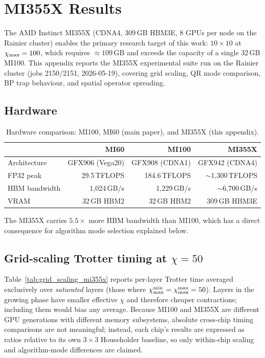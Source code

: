 \section{MI355X Results}
\label{app:mi355x}

The AMD Instinct MI355X (CDNA4, 309\,GB HBM3E, 8 GPUs per node on the Rainier
cluster) enables the primary research target of this work: $10\times10$ at
$\chi_{\mathrm{max}}=100$, which requires $\approx 109$\,GB and exceeds the capacity of a
single 32\,GB MI100.
This appendix reports the MI355X experimental suite run on the Rainier cluster
(jobs 2150/2151, 2026-05-19), covering grid scaling, QR mode comparison, BP
trap behaviour, and spatial operator spreading.

\subsection*{Hardware}

\begin{table}[ht]
\centering
\caption{Hardware comparison: MI100, MI60 (main paper), and MI355X (this appendix).}
\label{tab:hardware_mi355x}
\small
\begin{tabular}{lrrr}
\toprule
                  & MI60              & MI100             & MI355X \\
\midrule
Architecture      & GFX906 (Vega20)   & GFX908 (CDNA1)    & GFX942 (CDNA4) \\
FP32 peak         & 29.5\,TFLOPS      & 184.6\,TFLOPS     & $\sim$1{,}300\,TFLOPS \\
HBM bandwidth     & 1{,}024\,GB/s     & 1{,}229\,GB/s     & $\sim$6{,}700\,GB/s \\
VRAM              & 32\,GB HBM2       & 32\,GB HBM2       & 309\,GB HBM3E \\
\bottomrule
\end{tabular}
\end{table}

The MI355X carries $\mathbf{5.5\times}$ more HBM bandwidth than MI100, which
has a direct consequence for algorithm mode selection explained below.

\subsection*{Grid-scaling Trotter timing at $\chi = 50$}

Table~\ref{tab:grid_scaling_mi355x} reports per-layer Trotter time averaged
exclusively over \emph{saturated} layers (those where $\chi_{\mathrm{max}}^{\min} =
\chi_{\mathrm{max}}^{\max} = 50$).
Layers in the growing phase have smaller effective $\chi$ and therefore cheaper
contractions; including them would bias any average.
Because MI100 and MI355X are different GPU generations with different memory
subsystems, absolute cross-chip timing comparisons are not meaningful;
instead, each chip's results are expressed as ratios relative to its own
$3\times3$ Householder baseline, so only within-chip scaling and
algorithm-mode differences are claimed.

